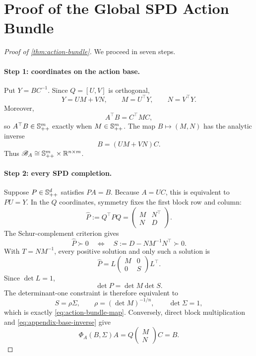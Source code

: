 \section{Proof of the Global SPD Action Bundle}
\label{app:action-bundle}

\begin{proof}[Proof of \cref{thm:action-bundle}]
We proceed in seven steps.

\paragraph{Step 1: coordinates on the action base.}
Put \(Y=BC^{-1}\).  Since \(Q=[U,V]\) is orthogonal,
\[
  Y=UM+VN,
  \qquad M=U^\top Y,
  \qquad N=V^\top Y.
\]
Moreover,
\[
  A^\top B=C^\top M C,
\]
so \(A^\top B\in\mathbb{S}_{++}^m\) exactly when \(M\in\mathbb{S}_{++}^m\).  The map
\(B\mapsto(M,N)\) has the analytic inverse
\begin{equation}
  B=(UM+VN)C.
  \label{eq:appendix-base-inverse}
\end{equation}
Thus \(\mathscr B_A\cong\mathbb{S}_{++}^m\times\mathbb R^{n\times m}\).

\paragraph{Step 2: every SPD completion.}
Suppose \(P\in\mathbb{S}_{++}^d\) satisfies \(PA=B\).  Because \(A=UC\), this is
equivalent to \(PU=Y\).  In the \(Q\) coordinates, symmetry fixes the first
block row and column:
\[
  \widehat P:=Q^\top P Q
  =\begin{pmatrix}M&N^\top\\N&D\end{pmatrix}.
\]
The Schur-complement criterion gives
\[
  \widehat P\succ0
  \quad\Longleftrightarrow\quad
  S:=D-NM^{-1}N^\top\succ0.
\]
With \(T=NM^{-1}\), every positive solution and only such a solution is
\begin{equation}
  \widehat P
  =L\begin{pmatrix}M&0\\0&S\end{pmatrix}L^\top.
  \label{eq:appendix-all-completions}
\end{equation}
Since \(\det L=1\),
\[
  \det P=\det M\det S.
\]
The determinant-one constraint is therefore equivalent to
\[
  S=\rho\Sigma,
  \qquad \rho=(\det M)^{-1/n},
  \qquad \det\Sigma=1,
\]
which is exactly \cref{eq:action-bundle-map}.  Conversely, direct block
multiplication and \cref{eq:appendix-base-inverse} give
\[
  \Phi_A(B,\Sigma)A
  =Q\begin{pmatrix}M\\N\end{pmatrix}C=B.
\]


\end{proof}

